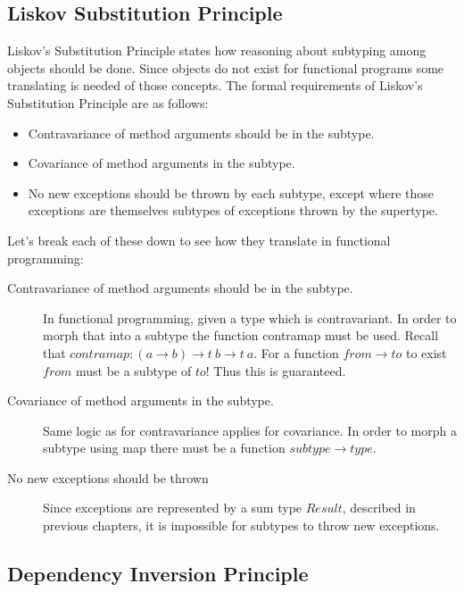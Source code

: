 \subsection{Liskov Substitution Principle}

Liskov's Substitution Principle states how reasoning about subtyping among
objects should be done. Since objects do not exist for functional programs some
translating is needed of those concepts. The formal requirements of Liskov's
Substitution Principle are as follows:

\begin{itemize}
    \item Contravariance of method arguments should be in the subtype.
    \item Covariance of method arguments in the subtype.
    \item No new exceptions should be thrown by each subtype, except where
        those exceptions are themselves subtypes of exceptions thrown by the
        supertype.
\end{itemize}

Let's break each of these down to see how they translate in functional
programming:

\begin{description}
    \item [Contravariance of method arguments should be in the subtype.] In
        functional programming, given a type which is contravariant. In order to
        morph that into a subtype the function contramap must be used. Recall
        that $contramap : (a\rightarrow b)\rightarrow t\ b\rightarrow t\ a$. For
        a function $from\rightarrow to$ to exist $from$ must be a
        subtype of $to$! Thus this is guaranteed.
    \item [Covariance of method arguments in the subtype.] Same logic as for
        contravariance applies for covariance. In order to morph a subtype using
        map there must be a function $subtype\rightarrow type$.
    \item [No new exceptions should be thrown] Since exceptions are represented
        by a sum type $Result$, described in previous chapters, it is impossible
        for subtypes to throw new exceptions.
\end{description}

\subsection{Dependency Inversion Principle} 

